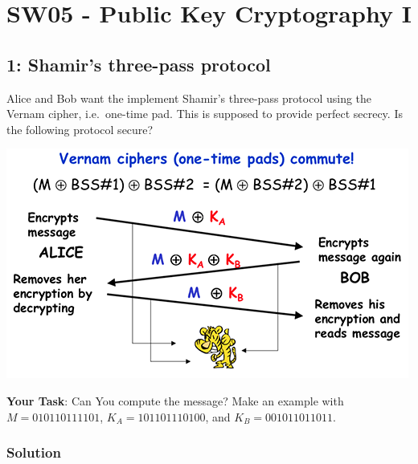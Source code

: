 \documentclass[11pt]{article}
\begin{document}
    

    \hypertarget{sw05---public-key-cryptography-i}{%
\section{SW05 - Public Key Cryptography
I}\label{sw05---public-key-cryptography-i}}

    \hypertarget{shamirs-three-pass-protocol}{%
\subsection{1: Shamir's three-pass
protocol}\label{shamirs-three-pass-protocol}}

Alice and Bob want the implement Shamir's three-pass protocol using the
Vernam cipher, i.e.~one-time pad. This is supposed to provide perfect
secrecy. Is the following protocol secure?

\begin{center}
	\includegraphics{img/VernamCiphers.png}
\end{center}


\textbf{Your Task}: Can You compute the message? Make an example with
\(M = 010110111101\), \(K_A = 101101110100\), and
\(K_B = 001011011011\).

\hypertarget{solution}{%
\subsubsection{Solution}\label{solution}}
\end{document}

